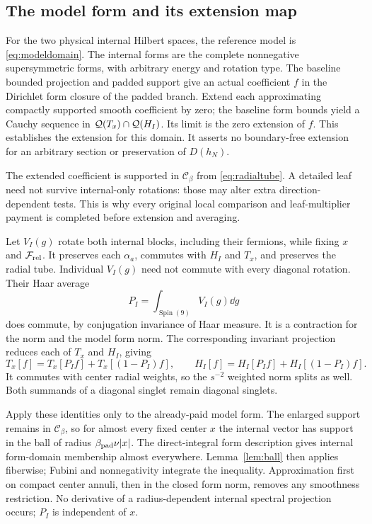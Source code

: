 \subsection{The model form and its extension map}
For the two physical internal Hilbert spaces, the reference model is \eqref{eq:modeldomain}. The internal forms are the complete nonnegative supersymmetric forms, with arbitrary energy and rotation type. The baseline bounded projection and padded support give an actual coefficient $f$ in the Dirichlet form closure of the padded branch. Extend each approximating compactly supported smooth coefficient by zero; the baseline form bounds yield a Cauchy sequence in $\mathcal Q(T_x)\cap\mathcal Q(H_I)$. Its limit is the zero extension of $f$. This establishes the extension for this domain. It asserts no boundary-free extension for an arbitrary section or preservation of $D(h_N)$.

The extended coefficient is supported in $\mathcal C_\beta$ from \eqref{eq:radialtube}. A detailed leaf need not survive internal-only rotations: those may alter extra direction-dependent tests. This is why every original local comparison and leaf-multiplier payment is completed before extension and averaging.

Let $V_I(g)$ rotate both internal blocks, including their fermions, while fixing $x$ and $\mathcal F_{\rm rel}$. It preserves each $\alpha_a$, commutes with $H_I$ and $T_x$, and preserves the radial tube. Individual $V_I(g)$ need not commute with every diagonal rotation. Their Haar average
\begin{equation}
 P_I=\int_{\operatorname{Spin}(9)}V_I(g)\dd g
\end{equation}
does commute, by conjugation invariance of Haar measure. It is a contraction for the norm and the model form norm. The corresponding invariant projection reduces each of $T_x$ and $H_I$, giving
\begin{equation}
 T_x[f]=T_x[P_If]+T_x[(1-P_I)f],\qquad
 H_I[f]=H_I[P_If]+H_I[(1-P_I)f].
\end{equation}
It commutes with center radial weights, so the $s^{-2}$ weighted norm splits as well. Both summands of a diagonal singlet remain diagonal singlets.

Apply these identities only to the already-paid model form. The enlarged support remains in $\mathcal C_\beta$, so for almost every fixed center $x$ the internal vector has support in the ball of radius $\beta_{\rm pad}\nu|x|$. The direct-integral form description gives internal form-domain membership almost everywhere. Lemma~\ref{lem:ball} then applies fiberwise; Fubini and nonnegativity integrate the inequality. Approximation first on compact center annuli, then in the closed form norm, removes any smoothness restriction. No derivative of a radius-dependent internal spectral projection occurs; $P_I$ is independent of $x$.


